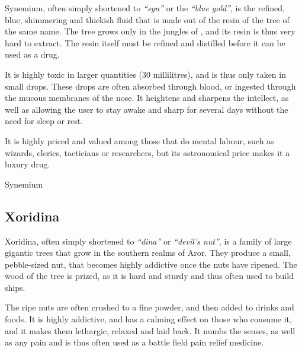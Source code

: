 Synemium, often simply shortened to \emph{``syn''} or the \emph{``blue gold''},
is the refined, blue, shimmering and thickish fluid that is made out of the
resin of the tree of the same name. The tree grows only in the jungles of
, and its resin is thus very hard to extract. The resin
itself must be refined and distilled before it can be used as a drug.

It is highly toxic in larger quantities (30 millilitres), and is thus only taken
in small drops. These drops are often absorbed through blood, or ingested
through the mucous membranes of the nose. It heightens and sharpens the
intellect, as well as allowing the user to stay awake and sharp for several
days without the need for sleep or rest.

It is highly priced and valued among those that do mental labour, such as
wizards, clerics, tacticians or researchers, but its astronomical price
makes it a luxury drug.

\begin{35e}{Synemium}
\end{35e}

\subsection{Xoridina}
\label{sec:Xoridina}

Xoridina, often simply shortened to \emph{``dina''} or \emph{``devil's nut''},
is a family of large gigantic trees that grow in the southern realms of
Aror. They produce a small, pebble-sized nut, that becomes highly addictive
once the nuts have ripened. The wood of the tree is prized, as it is hard and
sturdy and thus often used to build ships.

The ripe nuts are often crushed to a fine powder, and then added to drinks and
foods. It is highly addictive, and has a calming effect on those who consume
it, and it makes them lethargic, relaxed and laid back. It numbs the senses,
as well as any pain and is thus often used as a battle field pain relief
medicine.

